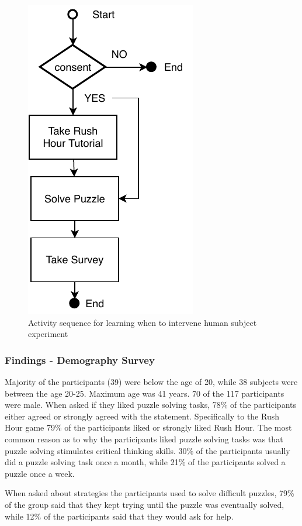 \documentclass[doctor]{thesis} %
\theoremstyle{plain}
\begin{document}
\begin{figure}[!hbt]
  \centering                                                    
  \includegraphics[keepaspectratio]{img/phase1.pdf}
  \caption{Activity sequence for learning when to intervene human subject experiment}
  \label{fig:phase1}
\end{figure}

\subsubsection*{Findings - Demography Survey}
Majority of the participants (39) were below the age of 20, while 38 subjects were between the age 20-25. Maximum age was 41 years. 70 of the 117 participants were male. When asked if they liked puzzle solving tasks, 78\% of the participants either agreed or strongly agreed with the statement. Specifically to the Rush Hour game 79\% of the participants liked or strongly liked Rush Hour. The most common reason as to why the participants liked puzzle solving tasks was that puzzle solving stimulates critical thinking skills. 30\% of the participants usually did a puzzle solving task once a month, while 21\% of the participants solved a puzzle once a week.

When asked about strategies the participants used to solve difficult puzzles, 79\% of the group said that they kept trying until the puzzle was eventually solved, while 12\% of the participants said that they would ask for help. 
\end{document}
